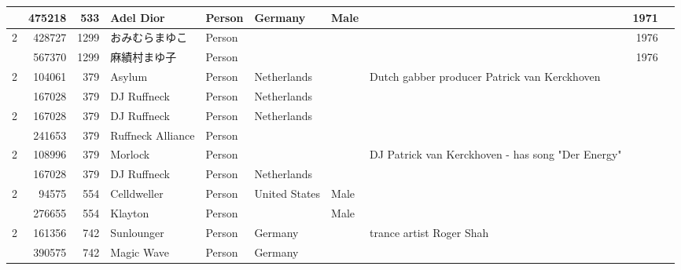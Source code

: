 \begin{tabular}{|r|rrlllllrr|}
         & 475218 &       533 & Adel Dior             & Person & Germany        & Male     &                                                   &         1971 &            \\
\hline
\multirow{2}{*}{2} & 428727 &      1299 & おみむらまゆこ               & Person &                &          &                                                   &         1976 &            \\
         & 567370 &      1299 & 麻績村まゆ子                & Person &                &          &                                                   &         1976 &            \\
\hline
\multirow{2}{*}{2} & 104061 &       379 & Asylum                & Person & Netherlands    &          & Dutch gabber producer Patrick van Kerckhoven      &              &            \\
         & 167028 &       379 & DJ Ruffneck           & Person & Netherlands    &          &                                                   &              &            \\
\hline
\multirow{2}{*}{2} & 167028 &       379 & DJ Ruffneck           & Person & Netherlands    &          &                                                   &              &            \\
         & 241653 &       379 & Ruffneck Alliance     & Person &                &          &                                                   &              &            \\
\hline
\multirow{2}{*}{2} & 108996 &       379 & Morlock               & Person &                &          & DJ Patrick van Kerckhoven - has song "Der Energy" &              &            \\
         & 167028 &       379 & DJ Ruffneck           & Person & Netherlands    &          &                                                   &              &            \\
\hline
\multirow{2}{*}{2} &  94575 &       554 & Celldweller           & Person & United States  & Male     &                                                   &              &            \\
         & 276655 &       554 & Klayton               & Person &                & Male     &                                                   &              &            \\
\hline
\multirow{2}{*}{2} & 161356 &       742 & Sunlounger            & Person & Germany        &          & trance artist Roger Shah                          &              &            \\
         & 390575 &       742 & Magic Wave            & Person & Germany        &          &                                                   &              &            \\
\hline
\end{tabular}
